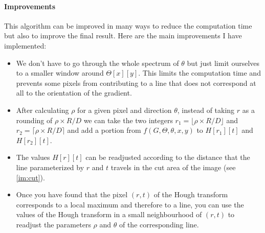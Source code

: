 \documentclass[11pt]{article}
\begin{document}
	\paragraph{Improvements}
	This algorithm can be improved in many ways to reduce the computation time but also to improve the final result. Here are the main improvements I have implemented:
	\begin{itemize}
		\item We don't have to go through the whole spectrum of $\theta$ but just limit ourselves to a smaller window around $\Theta[x][y]$. This limits the computation time and prevents some pixels from contributing to a line that does not correspond at all to the orientation of the gradient.
		\item After calculating $\rho$ for a given pixel and direction $\theta$, instead of taking $r$ as a rounding of $\rho \times R/D$ we can take the two integers $r_1 = \lfloor \rho \times R/D \rfloor$ and $r_2 = \lceil \rho \times R/D \rceil$ and add a portion from $f(G, \Theta, \theta, x, y)$ to $H[r_1][t]$ and $H[r_2][t]$.
		\item The values $H[r][t]$ can be readjusted according to the distance that the line parameterized by $r$ and $t$ travels in the cut area of the image (see \figurename \ref{im:cut}).
		\item Once you have found that the pixel $(r, t)$ of the Hough transform corresponds to a local maximum and therefore to a line, you can use the values of the Hough transform in a small neighbourhood of $(r, t)$ to readjust the parameters $\rho$ and $\theta$ of the corresponding line.
	\end{itemize}
	
\end{document}
